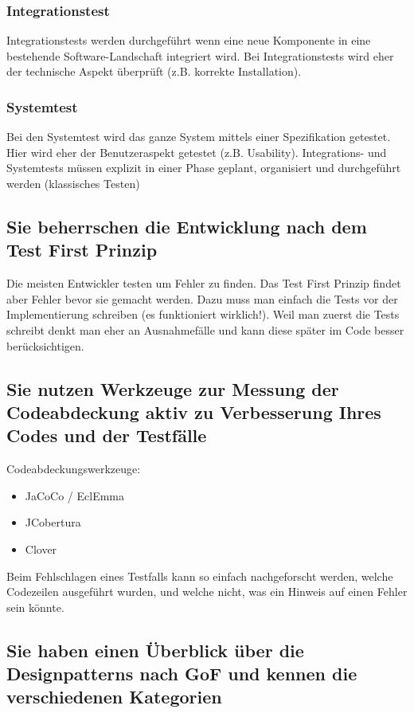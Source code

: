 \subsubsection{Integrationstest}

Integrationstests werden durchgeführt wenn eine neue Komponente in eine bestehende Software-Landschaft integriert wird. Bei Integrationstests wird eher der technische Aspekt überprüft (z.B. korrekte Installation).

\subsubsection{Systemtest}

Bei den Systemtest wird das ganze System mittels einer Spezifikation getestet. Hier wird eher der Benutzeraspekt getestet (z.B. Usability). Integrations- und Systemtests müssen explizit in einer Phase geplant, organisiert und durchgeführt werden (klassisches Testen)

\subsection{Sie beherrschen die Entwicklung nach dem Test First Prinzip}

Die meisten Entwickler testen um Fehler zu finden. Das Test First Prinzip findet aber Fehler bevor sie gemacht werden. 
Dazu muss man einfach die Tests vor der Implementierung schreiben (es funktioniert wirklich!). 
Weil man zuerst die Tests schreibt denkt man eher an Ausnahmefälle und kann diese später im Code besser berücksichtigen.

\subsection{Sie nutzen Werkzeuge zur Messung der Codeabdeckung aktiv zu Verbesserung Ihres Codes und der Testfälle}

Codeabdeckungswerkzeuge:
\begin{itemize}
	\item JaCoCo / EclEmma
	\item JCobertura
	\item Clover
\end{itemize}
Beim Fehlschlagen eines Testfalls kann so einfach nachgeforscht werden, welche Codezeilen ausgeführt wurden, und welche nicht, was ein Hinweis auf einen Fehler sein könnte.

\subsection{Sie haben einen Überblick über die Designpatterns nach GoF und kennen die verschiedenen Kategorien}


